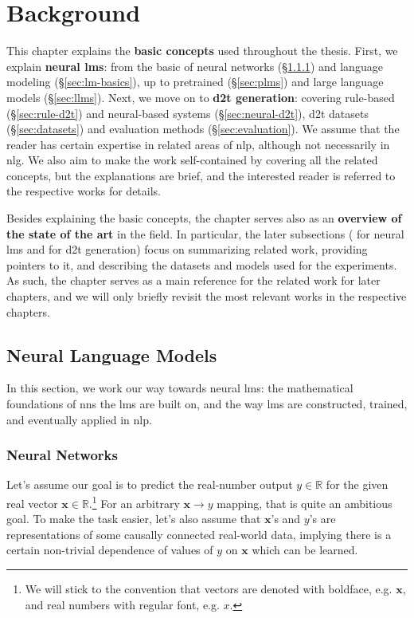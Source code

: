 
\chapter{Background}
\label{chap:background}

This chapter explains the \textbf{basic concepts} used throughout the thesis. First, we explain \textbf{neural \acp{lm}}: from the basic of neural networks (§\ref{sec:nns}) and language modeling (§\ref{sec:lm-basics}), up to pretrained (§\ref{sec:plms}) and large language models (§\ref{sec:llms}). Next, we move on to \textbf{\ac{d2t} generation}: covering rule-based (§\ref{sec:rule-d2t}) and neural-based systems (§\ref{sec:neural-d2t}), \ac{d2t} datasets (§\ref{sec:datasets}) and evaluation methods (§\ref{sec:evaluation}). We assume that the reader has certain expertise in related areas of \ac{nlp}, although not necessarily in \ac{nlg}. We also aim to make the work self-contained by covering all the related concepts, but the explanations are brief, and the interested reader is referred to the respective works for details.

Besides explaining the basic concepts, the chapter serves also as an \textbf{overview of the state of the art} in the field. In particular, the later subsections ( for neural \acp{lm} and  for \ac{d2t} generation) focus on summarizing related work, providing pointers to it, and describing the datasets and models used for the experiments. As such, the chapter serves as a main reference for the related work for later chapters, and we will only briefly revisit the most relevant works in the respective chapters.


\section{Neural Language Models}
\label{sec:lms}
In this section, we work our way towards neural \acp{lm}: the mathematical foundations of \acp{nn} the \acp{lm} are built on, and the way \acp{lm} are constructed, trained, and eventually applied in \ac{nlp}.

\subsection{Neural Networks}
\label{sec:nns}
Let's assume our goal is to predict the real-number output $y \in \mathbb{R}$ for the given real vector $\mathbf{x} \in \mathbb{R}$.\footnote{We will stick to the convention that vectors are denoted with boldface, e.g. $\mathbf{x}$, and real numbers with regular font, e.g. $x$.} For an arbitrary $\mathbf{x} \rightarrow y$ mapping, that is quite an ambitious goal. To make the task easier, let's also assume that $\mathbf{x}$'s and $y$'s are representations of some causally connected real-world data, implying there is a certain non-trivial dependence of values of $y$ on $\mathbf{x}$ which can be learned.

